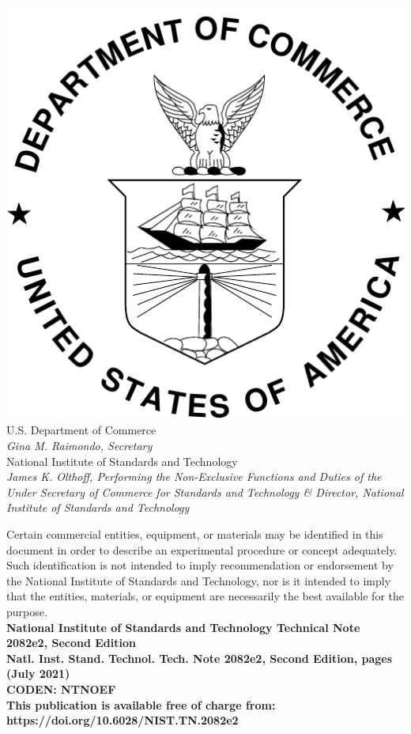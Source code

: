 \documentclass[12pt]{article}
\newcommand{\pubnumber}{2082e2, Second Edition}
\newcommand{\DOI}{https://doi.org/10.6028/NIST.TN.2082e2}
\newcommand{\monthyear}{July 2021}
\begin{document}
\begin{titlepage}
\begin{flushright}
\includegraphics[width=0.18\linewidth]{DoC-logo}\\
\vfill
\footnotesize U.S. Department of Commerce\\
\textit{Gina M. Raimondo, Secretary}\\
\vspace{10pt}
National Institute of Standards and Technology\\
\textit{James K. Olthoff, Performing the Non-Exclusive Functions and Duties of the Under Secretary of Commerce for Standards and Technology \& Director, National Institute of Standards and Technology}
\end{flushright}
\end{titlepage}

\begin{titlepage}
\begin{flushright}
\footnotesize  Certain commercial entities, equipment, or materials may be identified in this document in order to describe an experimental procedure or concept adequately. Such identification is not intended to imply recommendation or endorsement by the National Institute of Standards and Technology, nor is it intended to imply that the entities, materials, or equipment are necessarily the best available for the purpose.\\
\vfill
\normalsize \textbf{National Institute of Standards and Technology Technical Note \pubnumber\\
Natl. Inst. Stand. Technol. Tech. Note \pubnumber, \pageref{LastPage} pages (\monthyear)} \\
\textbf{CODEN: NTNOEF}\\
\vspace{12pt}
\textbf{This publication is available free of charge from: \DOI}
\vfill
\end{flushright}
\end{titlepage}
\end{document}

